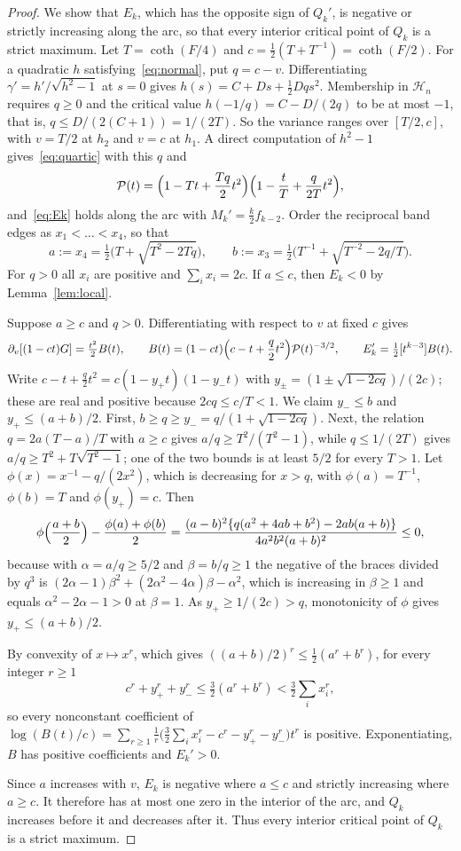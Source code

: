 \documentclass[11pt]{article}
\theoremstyle{remark}
\newcommand{\HH}{\mathcal H}
\begin{document}
\begin{proof}
We show that $E_k$, which has the opposite sign of $Q_k'$, is negative or
strictly increasing along the arc, so that every interior critical point of
$Q_k$ is a strict maximum. Let $T=\coth(F/4)$ and
$c=\frac12(T+T^{-1})=\coth(F/2)$. For a quadratic $h$
satisfying~\eqref{eq:normal}, put $q=c-v$. Differentiating
$\gamma'=h'/\sqrt{h^2-1}$ at $s=0$ gives $h(s)=C+Ds+\frac12Dqs^2$. Membership
in $\HH_n$ requires $q\ge0$ and the critical value $h(-1/q)=C-D/(2q)$ to be at
most $-1$, that is, $q\le D/(2(C+1))=1/(2T)$. So the variance ranges over
$[T/2,c]$, with $v=T/2$ at $h_2$ and $v=c$ at $h_1$. A direct computation of
$h^2-1$ gives~\eqref{eq:quartic} with this $q$ and
\[
\mathcal P(t)=\Bigl(1-Tt+\frac{Tq}2t^2\Bigr)\Bigl(1-\frac tT+\frac q{2T}t^2
\Bigr),
\]
and~\eqref{eq:Ek} holds along the arc with $M_k'=\frac k2f_{k-2}$. Order
the reciprocal band edges as $x_1<\dots<x_4$, so that
\[
a:=x_4=\tfrac12\bigl(T+\sqrt{T^2-2Tq}\bigr),\qquad
b:=x_3=\tfrac12\bigl(T^{-1}+\sqrt{T^{-2}-2q/T}\bigr).
\]
For $q>0$ all $x_i$ are positive and $\sum_ix_i=2c$. If $a\le c$, then
$E_k<0$ by Lemma~\ref{lem:local}.

Suppose $a\ge c$ and $q>0$. Differentiating with respect to $v$ at fixed
$c$ gives
\[
\partial_v[(1-ct)G]=\tfrac{t^2}2B(t),\qquad
B(t)=(1-ct)\Bigl(c-t+\frac q2t^2\Bigr)\mathcal P(t)^{-3/2},\qquad
E_k'=\tfrac12[t^{k-3}]B(t).
\]
Write $c-t+\frac q2t^2=c(1-y_+t)(1-y_-t)$ with
$y_\pm=(1\pm\sqrt{1-2cq})/(2c)$; these are real and positive because
$2cq\le c/T<1$. We claim $y_-\le b$ and $y_+\le(a+b)/2$. First,
$b\ge q\ge y_-=q/(1+\sqrt{1-2cq})$. Next, the relation $q=2a(T-a)/T$ with
$a\ge c$ gives $a/q\ge T^2/(T^2-1)$, while $q\le1/(2T)$ gives
$a/q\ge T^2+T\sqrt{T^2-1}$; one of the two bounds is at least $5/2$ for every
$T>1$. Let $\phi(x)=x^{-1}-q/(2x^2)$, which is decreasing for $x>q$, with
$\phi(a)=T^{-1}$, $\phi(b)=T$ and $\phi(y_+)=c$. Then
\[
\phi\Bigl(\frac{a+b}2\Bigr)-\frac{\phi(a)+\phi(b)}2
=\frac{(a-b)^2\{q(a^2+4ab+b^2)-2ab(a+b)\}}{4a^2b^2(a+b)^2}\le0,
\]
because with $\alpha=a/q\ge5/2$ and $\beta=b/q\ge1$ the negative of the
braces divided by $q^3$ is
$(2\alpha-1)\beta^2+(2\alpha^2-4\alpha)\beta-\alpha^2$, which is increasing
in $\beta\ge1$ and equals $\alpha^2-2\alpha-1>0$ at $\beta=1$. As
$y_+\ge1/(2c)>q$, monotonicity of $\phi$ gives $y_+\le(a+b)/2$.

By convexity of $x\mapsto x^r$, which gives
$((a+b)/2)^r\le\frac12(a^r+b^r)$, for every integer $r\ge1$
\[
c^r+y_+^r+y_-^r\le\tfrac32(a^r+b^r)<\tfrac32\sum_ix_i^r,
\]
so every nonconstant coefficient of
$\log(B(t)/c)=\sum_{r\ge1}\frac1r\bigl(\tfrac32\sum_ix_i^r-c^r-y_+^r-y_-^r
\bigr)t^r$ is positive. Exponentiating, $B$ has positive coefficients and
$E_k'>0$.

Since $a$ increases with $v$, $E_k$ is negative where $a\le c$ and strictly
increasing where $a\ge c$. It therefore has at most one zero in the interior
of the arc, and $Q_k$ increases before it and decreases after it. Thus every
interior critical point of $Q_k$ is a strict maximum.
\end{proof}
\end{document}
